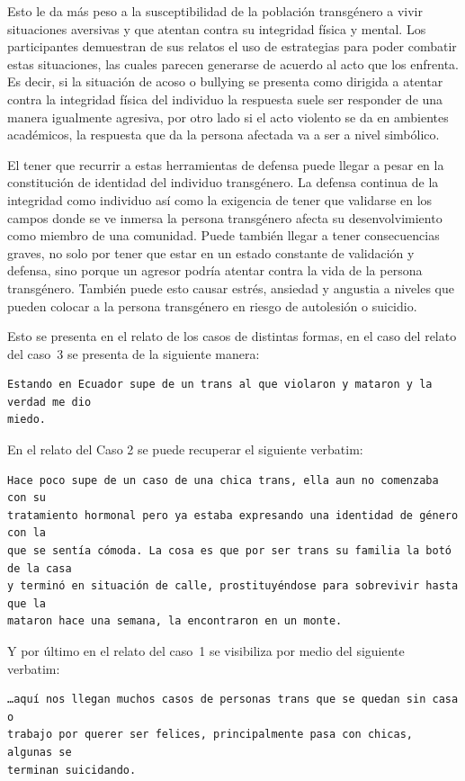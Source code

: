 Esto le da más peso a la susceptibilidad de la población transgénero a vivir
situaciones aversivas y que atentan contra su integridad física y mental. Los
participantes demuestran de sus relatos el uso de estrategias para poder
combatir estas situaciones, las cuales parecen generarse de acuerdo al acto que
los enfrenta. Es decir, si la situación de acoso o bullying se presenta como
dirigida a atentar contra la integridad física del individuo la respuesta suele
ser responder de una manera igualmente agresiva, por otro lado si el acto
violento se da en ambientes académicos, la respuesta que da la persona afectada
va a ser a nivel simbólico.

El tener que recurrir a estas herramientas de defensa puede llegar a pesar en la
constitución de identidad del individuo transgénero. La defensa continua de la
integridad como individuo así como la exigencia de tener que validarse en los
campos donde se ve inmersa la persona transgénero afecta su desenvolvimiento
como miembro de una comunidad. Puede también llegar a tener consecuencias
graves, no solo por tener que estar en un estado constante de validación y
defensa, sino porque un agresor podría atentar contra la vida de la persona
transgénero. También puede esto causar estrés, ansiedad y angustia a niveles que
pueden colocar a la persona transgénero en riesgo de autolesión o suicidio.

Esto se presenta en el relato de los casos de distintas formas, en el caso del
relato del caso~3 se presenta de la siguiente manera:

\begin{verbatim}
Estando en Ecuador supe de un trans al que violaron y mataron y la verdad me dio
miedo.
\end{verbatim}

En el relato del Caso 2 se puede recuperar el siguiente verbatim:

\begin{verbatim}
Hace poco supe de un caso de una chica trans, ella aun no comenzaba con su
tratamiento hormonal pero ya estaba expresando una identidad de género con la
que se sentía cómoda. La cosa es que por ser trans su familia la botó de la casa
y terminó en situación de calle, prostituyéndose para sobrevivir hasta que la
mataron hace una semana, la encontraron en un monte.
\end{verbatim}

Y por último en el relato del caso~1 se visibiliza por medio del siguiente
verbatim:

\begin{verbatim}
…aquí nos llegan muchos casos de personas trans que se quedan sin casa o
trabajo por querer ser felices, principalmente pasa con chicas, algunas se
terminan suicidando.
\end{verbatim}

